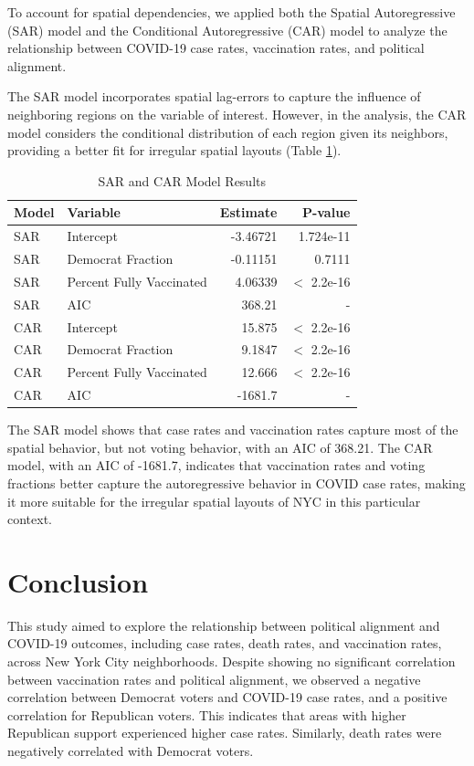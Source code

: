 \documentclass[10pt,journal,compsoc]{IEEEtran}
\begin{document}
To account for spatial dependencies, we applied both the Spatial Autoregressive (SAR) model and the Conditional Autoregressive (CAR) model to analyze the relationship between COVID-19 case rates, vaccination rates, and political alignment.

The SAR model incorporates spatial lag-errors to capture the influence of neighboring regions on the variable of interest. However, in the analysis, the CAR model considers the conditional distribution of each region given its neighbors, providing a better fit for irregular spatial layouts (Table \ref{tab:sar_car_results}).

\begin{table}[h]
    \centering
    \begin{tabular}{|l|l|r|r|}
        \hline
        \textbf{Model} & \textbf{Variable} & \textbf{Estimate} & \textbf{P-value} \\
        \hline
        SAR & Intercept & -3.46721 & 1.724e-11 \\
        SAR & Democrat Fraction & -0.11151 & 0.7111 \\
        SAR & Percent Fully Vaccinated & 4.06339 & $<$ 2.2e-16 \\
        SAR & AIC & 368.21 & - \\
        CAR & Intercept & 15.875 & $<$ 2.2e-16 \\
        CAR & Democrat Fraction & 9.1847 & $<$ 2.2e-16 \\
        CAR & Percent Fully Vaccinated & 12.666 & $<$ 2.2e-16 \\
        CAR & AIC & -1681.7 & - \\
        \hline
    \end{tabular}
    \caption{SAR and CAR Model Results}
    \label{tab:sar_car_results}
\end{table}

The SAR model shows that case rates and vaccination rates capture most of the spatial behavior, but not voting behavior, with an AIC of 368.21. The CAR model, with an AIC of -1681.7, indicates that vaccination rates and voting fractions better capture the autoregressive behavior in COVID case rates, making it more suitable for the irregular spatial layouts of NYC in this particular context.

\section{Conclusion}

This study aimed to explore the relationship between political alignment and COVID-19 outcomes, including case rates, death rates, and vaccination rates, across New York City neighborhoods. Despite showing no significant correlation between vaccination rates and political alignment, we observed a negative correlation between Democrat voters and COVID-19 case rates, and a positive correlation for Republican voters. This indicates that areas with higher Republican support experienced higher case rates. Similarly, death rates were negatively correlated with Democrat voters.
\end{document}
